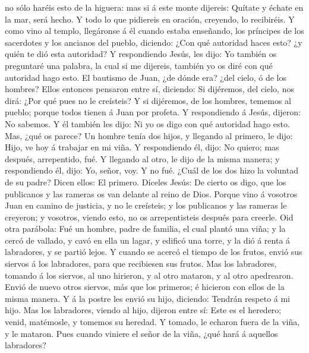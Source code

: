 no sólo haréis esto de la higuera: mas si á este monte dijereis: Quítate
y échate en la mar, será hecho.  Y todo lo que pidiereis
en oración, creyendo, lo recibiréis.  Y como vino al
templo, llegáronse á él cuando estaba enseñando, los príncipes de los
sacerdotes y los ancianos del pueblo, diciendo: ¿Con qué autoridad haces
esto? ¿y quién te dió esta autoridad?  Y respondiendo
Jesús, les dijo: Yo también os preguntaré una palabra, la cual si me
dijereis, también yo os diré con qué autoridad hago esto.
 El bautismo de Juan, ¿de dónde era? ¿del cielo, ó de los
hombres? Ellos entonces pensaron entre sí, diciendo: Si dijéremos, del
cielo, nos dirá: ¿Por qué pues no le creísteis?  Y si
dijéremos, de los hombres, tememos al pueblo; porque todos tienen á Juan
por profeta.  Y respondiendo á Jesús, dijeron: No
sabemos. Y él también les dijo: Ni yo os digo con qué autoridad hago
esto.  Mas, ¿qué os parece? Un hombre tenía dos hijos, y
llegando al primero, le dijo: Hijo, ve hoy á trabajar en mi viña.
 Y respondiendo él, dijo: No quiero; mas después,
arrepentido, fué.  Y llegando al otro, le dijo de la
misma manera; y respondiendo él, dijo: Yo, señor, voy. Y no fué.
 ¿Cuál de los dos hizo la voluntad de su padre? Dicen
ellos: El primero. Díceles Jesús: De cierto os digo, que los publicanos
y las rameras os van delante al reino de Dios.  Porque
vino á vosotros Juan en camino de justicia, y no le creísteis; y los
publicanos y las rameras le creyeron; y vosotros, viendo esto, no os
arrepentisteis después para creerle.  Oid otra parábola:
Fué un hombre, padre de familia, el cual plantó una viña; y la cercó de
vallado, y cavó en ella un lagar, y edificó una torre, y la dió á renta
á labradores, y se partió lejos.  Y cuando se acercó el
tiempo de los frutos, envió sus siervos á los labradores, para que
recibiesen sus frutos.  Mas los labradores, tomando á los
siervos, al uno hirieron, y al otro mataron, y al otro apedrearon.
 Envió de nuevo otros siervos, más que los primeros; é
hicieron con ellos de la misma manera.  Y á la postre les
envió su hijo, diciendo: Tendrán respeto á mi hijo.  Mas
los labradores, viendo al hijo, dijeron entre sí: Este es el heredero;
venid, matémosle, y tomemos su heredad.  Y tomado, le
echaron fuera de la viña, y le mataron.  Pues cuando
viniere el señor de la viña, ¿qué hará á aquellos labradores?
